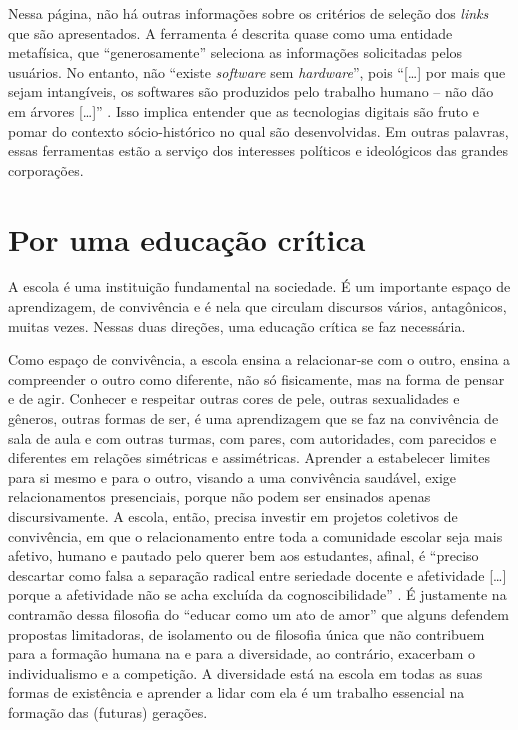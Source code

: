 \documentclass[portuguese]{textolivre}
\begin{document}
Nessa página, não há outras informações sobre os critérios de seleção dos \textit{links} que são apresentados. A ferramenta é descrita quase como uma entidade metafísica, que ``generosamente'' seleciona as informações solicitadas pelos usuários. No entanto, não ``existe \textit{software} sem \textit{hardware}'', pois ``[…] por mais que sejam intangíveis, os softwares são produzidos pelo trabalho humano – não dão em árvores […]'' \cite[p.~112]{faustino_colonialismo_2023}. Isso implica entender que as tecnologias digitais são fruto e pomar do contexto sócio-histórico no qual são desenvolvidas. Em outras palavras, essas ferramentas estão a serviço dos interesses políticos e ideológicos das grandes corporações.

\section{Por uma educação crítica}\label{sec-organizacao}
A escola é uma instituição fundamental na sociedade. É um importante espaço de aprendizagem, de convivência e é nela que circulam discursos vários, antagônicos, muitas vezes. Nessas duas direções, uma educação crítica se faz necessária.

Como espaço de convivência, a escola ensina a relacionar-se com o outro, ensina a compreender o outro como diferente, não só fisicamente, mas na forma de pensar e de agir. Conhecer e respeitar outras cores de pele, outras sexualidades e gêneros, outras formas de ser, é uma aprendizagem que se faz na convivência de sala de aula e com outras turmas, com pares, com autoridades, com parecidos e diferentes em relações simétricas e assimétricas. Aprender a estabelecer limites para si mesmo e para o outro, visando a uma convivência saudável, exige relacionamentos presenciais, porque não podem ser ensinados apenas discursivamente. A escola, então, precisa investir em projetos coletivos de convivência, em que o relacionamento entre toda a comunidade escolar seja mais afetivo, humano e pautado pelo querer bem aos estudantes, afinal, é ``preciso descartar como falsa a separação radical entre seriedade docente e afetividade […] porque a afetividade não se acha excluída da cognoscibilidade'' \cite[p.~138]{freire_pedagogia_2011}. É justamente na contramão dessa filosofia do ``educar como um ato de amor'' que alguns defendem propostas limitadoras, de isolamento ou de filosofia única que não contribuem para a formação humana na e para a diversidade, ao contrário, exacerbam o individualismo e a competição. A diversidade está na escola em todas as suas formas de existência e aprender a lidar com ela é um trabalho essencial na formação das (futuras) gerações.
\end{document}
